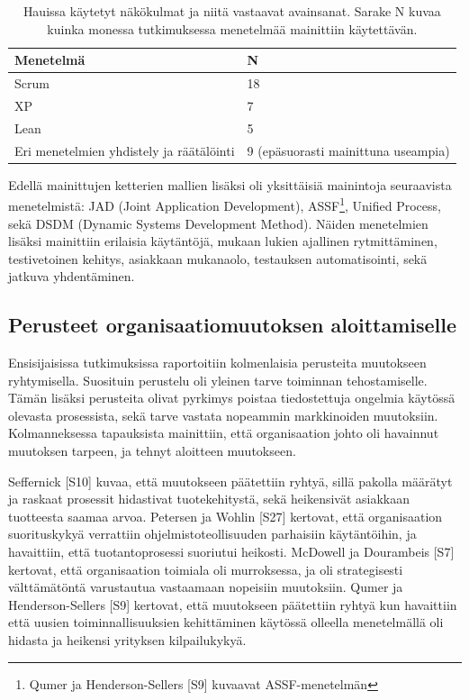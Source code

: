 \begin{table}[h]
    \begin{tabular}{ll}
        \toprule
        Menetelmä       & N   \\ \midrule
        Scrum           & 18 \\ 
        XP              & 7 \\
        Lean            & 5 \\
        Eri menetelmien yhdistely ja räätälöinti & 9  (epäsuorasti mainittuna useampia) \\
        \bottomrule
    \end{tabular}
	\caption{Hauissa käytetyt näkökulmat ja niitä vastaavat avainsanat. Sarake N
	kuvaa kuinka monessa tutkimuksessa menetelmää mainittiin käytettävän.}
	\label{table:practices}
\end{table}

Edellä mainittujen ketterien mallien lisäksi oli yksittäisiä mainintoja
seuraavista menetelmistä: JAD (Joint Application Development),
ASSF\footnote{Qumer ja Henderson-Sellers [S9] kuvaavat ASSF-menetelmän}, Unified
Process, sekä DSDM (Dynamic Systems Development Method). Näiden menetelmien
lisäksi mainittiin erilaisia käytäntöjä, mukaan lukien ajallinen rytmittäminen,
testivetoinen kehitys, asiakkaan mukanaolo, testauksen automatisointi, sekä
jatkuva yhdentäminen.

\subsection{Perusteet organisaatiomuutoksen aloittamiselle}

Ensisijaisissa tutkimuksissa raportoitiin kolmenlaisia perusteita muutokseen
ryhtymisella. Suosituin perustelu oli yleinen tarve toiminnan tehostamiselle.
Tämän lisäksi perusteita olivat pyrkimys poistaa tiedostettuja ongelmia käytössä
olevasta prosessista, sekä tarve vastata nopeammin markkinoiden muutoksiin.
Kolmanneksessa tapauksista mainittiin, että organisaation johto oli havainnut
muutoksen tarpeen, ja tehnyt aloitteen muutokseen.

Seffernick [S10] kuvaa, että muutokseen päätettiin ryhtyä, sillä pakolla
määrätyt ja raskaat prosessit hidastivat tuotekehitystä, sekä heikensivät
asiakkaan tuotteesta saamaa arvoa. Petersen ja Wohlin [S27] kertovat, että
organisaation suorituskykyä verrattiin ohjelmistoteollisuuden parhaisiin
käytäntöihin, ja havaittiin, että tuotantoprosessi suoriutui heikosti. McDowell
ja Dourambeis [S7] kertovat, että organisaation toimiala oli murroksessa, ja
oli strategisesti välttämätöntä varustautua vastaamaan nopeisiin muutoksiin.
Qumer ja Henderson-Sellers [S9] kertovat, että muutokseen päätettiin ryhtyä kun
havaittiin että uusien toiminnallisuuksien kehittäminen käytössä olleella
menetelmällä oli hidasta ja heikensi yrityksen kilpailukykyä.

